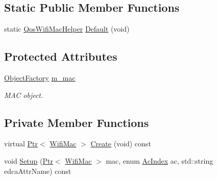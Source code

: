\subsection*{Static Public Member Functions}
\begin{DoxyCompactItemize}
\item 
static \hyperlink{classns3_1_1QosWifiMacHelper}{Qos\+Wifi\+Mac\+Helper} \hyperlink{classns3_1_1QosWifiMacHelper_a8add3690a750a65d23790e47813606a3}{Default} (void)
\end{DoxyCompactItemize}
\subsection*{Protected Attributes}
\begin{DoxyCompactItemize}
\item 
\hyperlink{classns3_1_1ObjectFactory}{Object\+Factory} \hyperlink{classns3_1_1QosWifiMacHelper_ac45022993a588895c5b7cca7a521ba4e}{m\+\_\+mac}
\begin{DoxyCompactList}\small\item\em M\+AC object. \end{DoxyCompactList}\end{DoxyCompactItemize}
\subsection*{Private Member Functions}
\begin{DoxyCompactItemize}
\item 
virtual \hyperlink{classns3_1_1Ptr}{Ptr}$<$ \hyperlink{classns3_1_1WifiMac}{Wifi\+Mac} $>$ \hyperlink{classns3_1_1QosWifiMacHelper_a4a2afe230ee4a2ed2f155beb5a874d95}{Create} (void) const 
\item 
void \hyperlink{classns3_1_1QosWifiMacHelper_afa4b9a2a5bcf68fbb81ebedb7d09bf7a}{Setup} (\hyperlink{classns3_1_1Ptr}{Ptr}$<$ \hyperlink{classns3_1_1WifiMac}{Wifi\+Mac} $>$ mac, enum \hyperlink{group__wifi_gab422b4562ba272b39a9b6bca3513f3ac}{Ac\+Index} ac, std\+::string edca\+Attr\+Name) const 
\end{DoxyCompactItemize}
